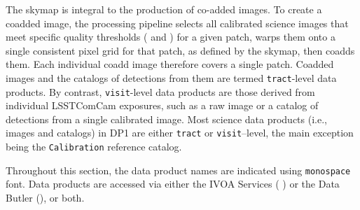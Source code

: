 The skymap is integral to the production of co-added images.
To create a coadded image, the processing pipeline selects all calibrated science images that meet specific quality thresholds ( and ) for a given patch, warps them onto a single consistent pixel grid for that patch, as defined by the skymap, then coadds them.
Each individual coadd image therefore covers a single patch.
Coadded images and the catalogs of detections from them are termed \texttt{tract}-level data products. 
By contrast, \texttt{visit}-level data products are those derived from individual LSSTComCam exposures, such as a raw image or a catalog of detections from a single calibrated image.
Most science data products (i.e., images and catalogs) in DP1 are either \texttt{tract} or \texttt{visit}--level, the main exception being the \texttt{Calibration} reference catalog.

Throughout this section, the data product names are indicated using \texttt{monospace} font. 
Data products are accessed via either the IVOA Services ( ) or the Data Butler (), or both. 





